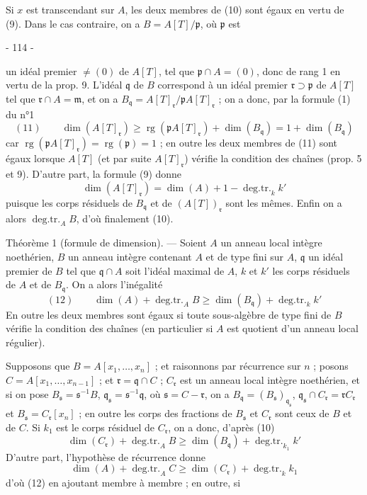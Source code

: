 Si $x$ est transcendant sur $A$, les deux membres de (10) sont égaux en vertu de (9). Dans le cas contraire, on a $B = A[T]/\mathfrak{p}$, où $\mathfrak{p}$ est

\newpage


- 114 -

un idéal premier $\neq (0)$ de $A[T]$, tel que $\mathfrak{p} \cap A = (0)$, donc de rang 1 en vertu de la prop. 9. L'idéal $\mathfrak{q}$ de $B$ correspond à un idéal premier $\mathfrak{r} \supset \mathfrak{p}$ de $A[T]$ tel que $\mathfrak{r} \cap A = \mathfrak{m}$, et on a $B_{\mathfrak{q}} = A[T]_{\mathfrak{r}} / \mathfrak{p} A[T]_{\mathfrak{r}}$ ; on a donc, par la formule (1) du n°1
$$(11) \qquad \dim(A[T]_{\mathfrak{r}}) \ge \operatorname{rg}(\mathfrak{p}A[T]_{\mathfrak{r}}) + \dim(B_{\mathfrak{q}}) = 1 + \dim(B_{\mathfrak{q}})$$
car $\operatorname{rg}(\mathfrak{p}A[T]_{\mathfrak{r}}) = \operatorname{rg}(\mathfrak{p}) = 1$ ; en outre les deux membres de (11) sont égaux lorsque $A[T]$ (et par suite $A[T]_{\mathfrak{r}}$) vérifie la condition des chaînes (prop. 5 et 9). D'autre part, la formule (9) donne
$$\dim(A[T]_{\mathfrak{r}}) = \dim(A) + 1 - \operatorname{deg.tr.}_k k'$$
puisque les corps résiduels de $B_{\mathfrak{q}}$ et de $(A[T])_{\mathfrak{r}}$ sont les mêmes. Enfin on a alors $\operatorname{deg.tr.}_A B$, d'où finalement (10).

Théorème 1 (formule de dimension). — Soient $A$ un anneau local intègre noethérien, $B$ un anneau intègre contenant $A$ et de type fini sur $A$, $\mathfrak{q}$ un idéal premier de $B$ tel que $\mathfrak{q} \cap A$ soit l'idéal maximal de $A$, $k$ et $k'$ les corps résiduels de $A$ et de $B_{\mathfrak{q}}$. On a alors l'inégalité
$$(12) \qquad \dim(A) + \operatorname{deg.tr.}_A B \ge \dim(B_{\mathfrak{q}}) + \operatorname{deg.tr.}_k k'$$
En outre les deux membres sont égaux si toute sous-algèbre de type fini de $B$ vérifie la condition des chaînes (en particulier si $A$ est quotient d'un anneau local régulier).

Supposons que $B = A[x_1, \dots, x_n]$ ; et raisonnons par récurrence sur $n$ ; posons $C = A[x_1, \dots, x_{n-1}]$ ; et $\mathfrak{r} = \mathfrak{q} \cap C$ ; $C_{\mathfrak{r}}$ est un anneau local intègre noethérien, et si on pose $B_{\mathfrak{s}} = \mathfrak{s}^{-1}B$, $\mathfrak{q}_{\mathfrak{s}} = \mathfrak{s}^{-1}\mathfrak{q}$, où $\mathfrak{s} = C - \mathfrak{r}$, on a $B_{\mathfrak{q}} = (B_{\mathfrak{s}})_{\mathfrak{q}_{\mathfrak{s}}}$, $\mathfrak{q}_{\mathfrak{s}} \cap C_{\mathfrak{r}} = \mathfrak{r}C_{\mathfrak{r}}$ et $B_{\mathfrak{s}} = C_{\mathfrak{r}}[x_n]$ ; en outre les corps des fractions de $B_{\mathfrak{s}}$ et $C_{\mathfrak{r}}$ sont ceux de $B$ et de $C$. Si $k_1$ est le corps résiduel de $C_{\mathfrak{r}}$, on a donc, d'après (10)
$$\dim(C_{\mathfrak{r}}) + \operatorname{deg.tr.}_A B \ge \dim(B_{\mathfrak{q}}) + \operatorname{deg.tr.}_{k_1} k'$$
D'autre part, l'hypothèse de récurrence donne
$$\dim(A) + \operatorname{deg.tr.}_A C \ge \dim(C_{\mathfrak{r}}) + \operatorname{deg.tr.}_k k_1$$
d'où (12) en ajoutant membre à membre ; en outre, si

